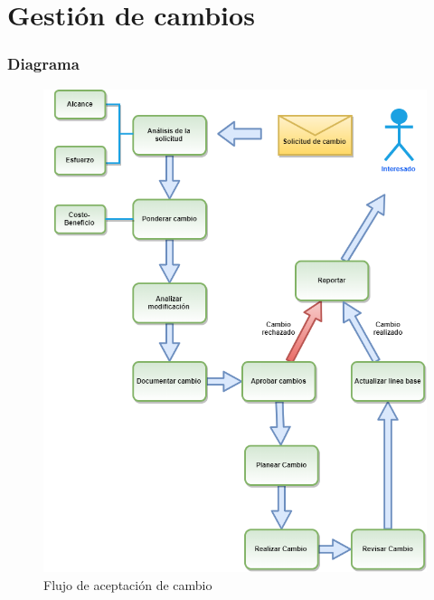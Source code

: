 \chapter{Gestión de cambios}
\subsection{Diagrama}
\begin{figure}[H]
    \centering
    \includegraphics[scale=0.50]{Files/gestCambios.png}
    \caption{Flujo de aceptación de cambio}
    \label{fig:clases}
\end{figure}

